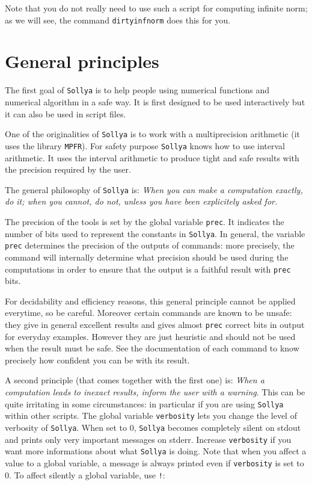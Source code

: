 \documentclass[a4paper]{article}
\newcommand{\com}[1]{\texttt{#1}}
\newcommand{\key}[1]{\texttt{#1}}
\newcommand{\sollya}{\texttt{Sollya}\xspace}
\begin{document}
Note that you do not really need to use such a script for computing infinite norm; as we will see, the command \com{dirtyinfnorm} does this for you.

\section{General principles}
The first goal of \sollya is to help people using numerical functions and numerical algorithm in a safe way. It is first designed to be used interactively but it can also be used in script files.

One of the originalities of \sollya is to work with a multiprecision arithmetic (it uses the library \texttt{MPFR}). For safety purpose \sollya knows how to use interval arithmetic. It uses the interval arithmetic to produce tight and safe results with the precision required by the user.

The general philosophy of \sollya is: \emph{When you can make a computation exactly, do it; when you cannot, do not, unless you have been explicitely asked for.}

The precision of the tools is set by the global variable \key{prec}. It indicates the number of bits used to represent the constants in \sollya. In general, the variable \key{prec} determines the precision of the outputs of commands: more precisely, the command will internally determine what precision should be used during the computations in order to ensure that the output is a faithful result with \key{prec} bits.

For decidability and efficiency reasons, this general principle cannot be applied everytime, so be careful. Moreover certain commands are known to be unsafe: they give in general excellent results and gives almost \key{prec} correct bits in output for everyday examples. However they are just heuristic and should not be used when the result must be safe. See the documentation of each command to know precisely how confident you can be with its result.

A second principle (that comes together with the first one) is: \emph{When a computation leads to inexact results, inform the user with a warning}. This can be quite irritating in some circumstances: in particular if you are using \sollya within other scripts. The global variable \key{verbosity} lets you change the level of verbosity of \sollya. When set to $0$, \sollya becomes completely silent on stdout and prints only very important messages on stderr. Increase \key{verbosity} if you want more informations about what \sollya is doing. Note that when you affect a value to a global variable, a message is always printed even if \com{verbosity} is set to $0$. To affect silently a global variable, use \texttt{!}:
\end{document}
